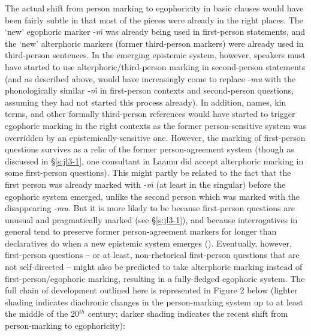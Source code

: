 \documentclass[output=paper]{langsci/langscibook}
\begin{document}
The actual shift from person marking to egophoricity in basic clauses would have been fairly subtle in that most of the pieces were already in the right places. The ‘new’ egophoric marker ‑\textit{m̊} was already being used in first-person statements, and the ‘new’ alterphoric markers (former third-person markers) were already used in third-person sentences. In the emerging epistemic system, however, speakers must have started to use alterphoric/third-person marking in second-person statements (and as described above, would have increasingly come to replace ‑\textit{mu} with the phonologically similar ‑\textit{m̊} in first-person contexts and second-person questions, assuming they had not started this process already). In addition, names, kin terms, and other formally third-person references would have started to trigger egophoric marking in the right contexts as the former person-sensitive system was overridden by an epistemically-sensitive one. However, the marking of first-person questions survives as a relic of the former person-agreement system (though as discussed in §\ref{s:jl‎3-1}, one consultant in Laamu did accept alterphoric marking in some first-person questions). This might partly be related to the fact that the first person was already marked with ‑\textit{m̊} (at least in the singular) before the egophoric system emerged, unlike the second person which was marked with the disappearing ‑\textit{mu}. But it is more likely to be because first-person questions are unusual and pragmatically marked (see §\ref{s:jl‎3-1}), and because interrogatives in general tend to preserve former person-agreement markers for longer than declaratives do when a new epistemic system emerges (\citealt{WidmerZemp2017}). Eventually, however, first-person questions ‒ or at least, non-rhetorical first-person questions that are not self-directed ‒ might also be predicted to take alterphoric marking instead of first-person/egophoric marking, resulting in a fully-fledged egophoric system. The full chain of development outlined here is represented in Figure 2 %
below (lighter shading indicates diachronic changes in the person-marking system up to at least the middle of the 20$^{th}$ century; darker shading indicates the recent shift from person-marking to egophoricity):

\end{document}
